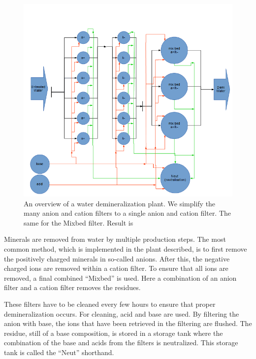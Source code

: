 \begin{figure}[h]
	\centering
	\includegraphics[width=1\linewidth]{img/demi-plant}
	\caption{An overview of a water demineralization plant. We simplify the many anion and cation filters to a single anion and cation filter. The same for the Mixbed filter. Result is }
	\label{fig:demi-plant}
\end{figure}

Minerals are removed from water by multiple production steps. The most common method, which is implemented in the plant described, is to first remove the positively charged minerals in so-called anions. After this, the negative charged ions are removed within a cation filter. To ensure that all ions are removed, a final combined ``Mixbed'' is used. Here a combination of an anion filter and a cation filter removes the residues.

These filters have to be cleaned every few hours to ensure that proper demineralization occurs. For cleaning, acid and base are used. By filtering the anion with base, the ions that have been retrieved in the filtering are flushed. The residue, still of a base composition, is stored in a storage tank where the combination of the base and acids from the filters is neutralized. This storage tank is called the ``Neut'' shorthand.

